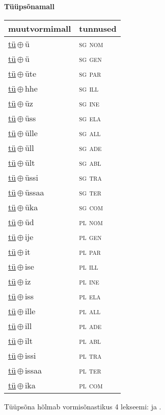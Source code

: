 

\vspace{3.5em}
\noindent \begin{minipage}{\textwidth}
\noindent \textbf{Tüüpsõnamall \,}\\

\begin{sideways}
\begin{tabular}{l l}
muutvormimall & tunnused \\
\hline
\underline{tü}\,$\oplus$\,ü & \textsc{ sg nom } \\
\underline{tü}\,$\oplus$\,ü & \textsc{ sg gen } \\
\underline{tü}\,$\oplus$\,üte & \textsc{ sg par } \\
\underline{tü}\,$\oplus$\,hhe & \textsc{ sg ill } \\
\underline{tü}\,$\oplus$\,üz & \textsc{ sg ine } \\
\underline{tü}\,$\oplus$\,üss & \textsc{ sg ela } \\
\underline{tü}\,$\oplus$\,ülle & \textsc{ sg all } \\
\underline{tü}\,$\oplus$\,üll & \textsc{ sg ade } \\
\underline{tü}\,$\oplus$\,ült & \textsc{ sg abl } \\
\underline{tü}\,$\oplus$\,üssi & \textsc{ sg tra } \\
\underline{tü}\,$\oplus$\,üssaa & \textsc{ sg ter } \\
\underline{tü}\,$\oplus$\,üka & \textsc{ sg com } \\
\underline{tü}\,$\oplus$\,üd & \textsc{ pl nom } \\
\underline{tü}\,$\oplus$\,ije & \textsc{ pl gen } \\
\underline{tü}\,$\oplus$\,it & \textsc{ pl par } \\
\underline{tü}\,$\oplus$\,ise & \textsc{ pl ill } \\
\underline{tü}\,$\oplus$\,iz & \textsc{ pl ine } \\
\underline{tü}\,$\oplus$\,iss & \textsc{ pl ela } \\
\underline{tü}\,$\oplus$\,ille & \textsc{ pl all } \\
\underline{tü}\,$\oplus$\,ill & \textsc{ pl ade } \\
\underline{tü}\,$\oplus$\,ilt & \textsc{ pl abl } \\
\underline{tü}\,$\oplus$\,issi & \textsc{ pl tra } \\
\underline{tü}\,$\oplus$\,issaa & \textsc{ pl ter } \\
\underline{tü}\,$\oplus$\,ika & \textsc{ pl com } \\
\end{tabular}
\end{sideways}
\label{tab:tüüpsõnamall-tüü}

\end{minipage}

 
\vspace{1em}
\noindent Tüüpsõna hõlmab vormisõnastikus 4 lekseemi:  ja .
